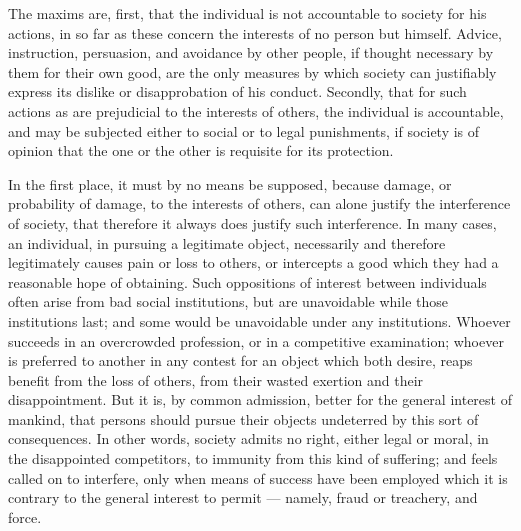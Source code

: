 \documentclass[12pt]{report}
\begin{document}
The maxims are, first, that the individual is not accountable to society for his actions, in so far as these concern the interests of no person but himself. Advice, instruction, persuasion, and avoidance by other people, if thought necessary by them for their own good, are the only measures by which society can justifiably express its dislike or disapprobation of his conduct. Secondly, that for such actions as are prejudicial to the interests of others, the individual is accountable, and may be subjected either to social or to legal punishments, if society is of opinion that the one or the other is requisite for its protection.

In the first place, it must by no means be supposed, because damage, or probability of damage, to the interests of others, can alone justify the interference of society, that therefore it always does justify such interference. In many cases, an individual, in pursuing a legitimate object, necessarily and therefore legitimately causes pain or loss to others, or intercepts a good which they had a reasonable hope of obtaining. Such oppositions of interest between individuals often arise from bad social institutions, but are unavoidable while those institutions last; and some would be unavoidable under any institutions. Whoever succeeds in an overcrowded profession, or in a competitive examination; whoever is preferred to another in any contest for an object which both desire, reaps benefit from the loss of others, from their wasted exertion and their disappointment. But it is, by common admission, better for the general interest of mankind, that persons should pursue their objects undeterred by this sort of consequences. In other words, society admits no right, either legal or moral, in the disappointed competitors, to immunity from this kind of suffering; and feels called on to interfere, only when means of success have been employed which it is contrary to the general interest to permit — namely, fraud or treachery, and force.
\end{document}
